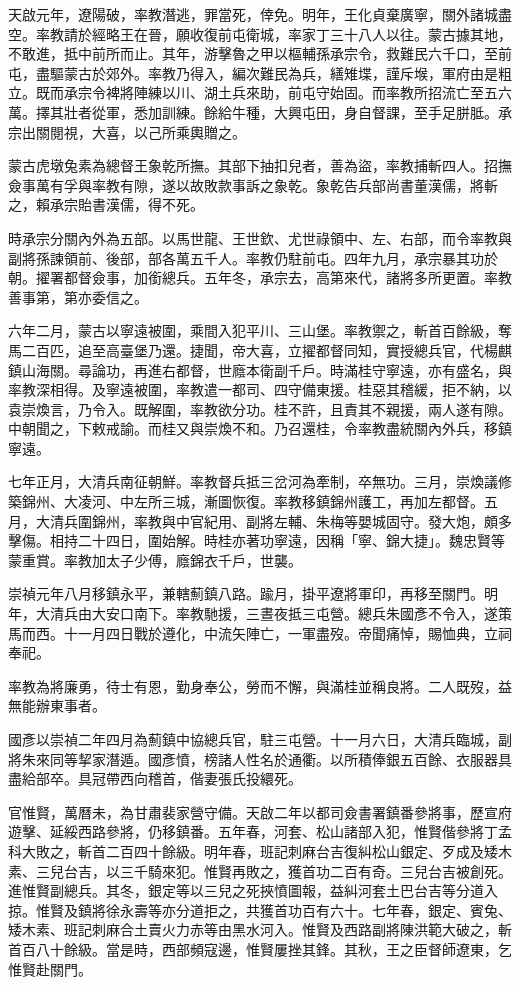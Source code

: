 \begin{pinyinscope}
天啟元年，遼陽破，率教潛逃，罪當死，倖免。明年，王化貞棄廣寧，關外諸城盡空。率教請於經略王在晉，願收復前屯衛城，率家丁三十八人以往。蒙古據其地，不敢進，抵中前所而止。其年，游擊魯之甲以樞輔孫承宗令，救難民六千口，至前屯，盡驅蒙古於郊外。率教乃得入，編次難民為兵，繕雉堞，謹斥堠，軍府由是粗立。既而承宗令裨將陣練以川、湖土兵來助，前屯守始固。而率教所招流亡至五六萬。擇其壯者從軍，悉加訓練。餘給牛種，大興屯田，身自督課，至手足胼胝。承宗出關閱視，大喜，以己所乘輿贈之。

蒙古虎墩兔素為總督王象乾所撫。其部下抽扣兒者，善為盜，率教捕斬四人。招撫僉事萬有孚與率教有隙，遂以故敗款事訴之象乾。象乾告兵部尚書董漢儒，將斬之，賴承宗貽書漢儒，得不死。

時承宗分關內外為五部。以馬世龍、王世欽、尤世祿領中、左、右部，而令率教與副將孫諫領前、後部，部各萬五千人。率教仍駐前屯。四年九月，承宗暴其功於朝。擢署都督僉事，加銜總兵。五年冬，承宗去，高第來代，諸將多所更置。率教善事第，第亦委信之。

六年二月，蒙古以寧遠被圍，乘間入犯平川、三山堡。率教禦之，斬首百餘級，奪馬二百匹，追至高臺堡乃還。捷聞，帝大喜，立擢都督同知，實授總兵官，代楊麒鎮山海關。尋論功，再進右都督，世廕本衛副千戶。時滿桂守寧遠，亦有盛名，與率教深相得。及寧遠被圍，率教遣一都司、四守備東援。桂惡其稽緩，拒不納，以袁崇煥言，乃令入。既解圍，率教欲分功。桂不許，且責其不親援，兩人遂有隙。中朝聞之，下敕戒諭。而桂又與崇煥不和。乃召還桂，令率教盡統關內外兵，移鎮寧遠。

七年正月，大清兵南征朝鮮。率教督兵抵三岔河為牽制，卒無功。三月，崇煥議修築錦州、大凌河、中左所三城，漸圖恢復。率教移鎮錦州護工，再加左都督。五月，大清兵圍錦州，率教與中官紀用、副將左輔、朱梅等嬰城固守。發大炮，頗多擊傷。相持二十四日，圍始解。時桂亦著功寧遠，因稱「寧、錦大捷」。魏忠賢等蒙重賞。率教加太子少傅，廕錦衣千戶，世襲。

崇禎元年八月移鎮永平，兼轄薊鎮八路。踰月，掛平遼將軍印，再移至關門。明年，大清兵由大安口南下。率教馳援，三晝夜抵三屯營。總兵朱國彥不令入，遂策馬而西。十一月四日戰於遵化，中流矢陣亡，一軍盡歿。帝聞痛悼，賜恤典，立祠奉祀。

率教為將廉勇，待士有恩，勤身奉公，勞而不懈，與滿桂並稱良將。二人既歿，益無能辦東事者。

國彥以崇禎二年四月為薊鎮中協總兵官，駐三屯營。十一月六日，大清兵臨城，副將朱來同等挈家潛遁。國彥憤，榜諸人性名於通衢。以所積俸銀五百餘、衣服器具盡給部卒。具冠帶西向稽首，偕妻張氏投繯死。

官惟賢，萬曆未，為甘肅裴家營守備。天啟二年以都司僉書署鎮番參將事，歷宣府遊擊、延綏西路參將，仍移鎮番。五年春，河套、松山諸部入犯，惟賢偕參將丁孟科大敗之，斬首二百四十餘級。明年春，班記刺麻台吉復糾松山銀定、歹成及矮木素、三兒台吉，以三千騎來犯。惟賢再敗之，獲首功二百有奇。三兒台吉被創死。進惟賢副總兵。其冬，銀定等以三兒之死挾憤圖報，益糾河套土巴台吉等分道入掠。惟賢及鎮將徐永壽等亦分道拒之，共獲首功百有六十。七年春，銀定、賓兔、矮木素、班記刺麻合土賣火力赤等由黑水河入。惟賢及西路副將陳洪範大破之，斬首百八十餘級。當是時，西部頻寇邊，惟賢屢挫其鋒。其秋，王之臣督師遼東，乞惟賢赴關門。


\end{pinyinscope}
